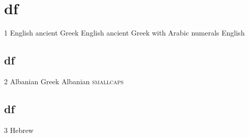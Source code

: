 \documentclass{article}
\begin{document}
\part{df}

1 English \textgreek[variant=ancient]{ancient Greek} English
\textgreek[numerals=arabic, variant=ancient]{ancient G\textsf{reek} with Arabic numerals} English

\begin{albanian}%

\part{df}

2 Albanian \textgreek{Greek} Albanian \textsc{smallcaps}

\end{albanian}%
\begin{hebrew}%

\part{df}

3 Hebrew

\end{hebrew}%

\begin{albanian}%
\end{albanian}%
\end{document}
